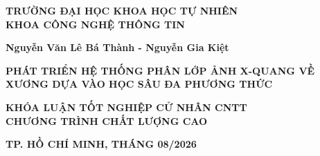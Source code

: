 \begin{titlepage}

\begin{center}

\color{yellow!95!black} %
\vspace*{0.3cm}

{\bfseries TRƯỜNG ĐẠI HỌC KHOA HỌC TỰ NHIÊN\\
KHOA CÔNG NGHỆ THÔNG TIN\\[2cm]}

{\large \bfseries Nguyễn Văn Lê Bá Thành - Nguyễn Gia Kiệt\\[2cm]}

{\Large \bfseries PHÁT TRIỂN HỆ THỐNG PHÂN LỚP ẢNH X-QUANG VỀ XƯƠNG DỰA VÀO HỌC SÂU ĐA PHƯƠNG THỨC\\[3cm]}

{\bfseries KHÓA LUẬN TỐT NGHIỆP CỬ NHÂN CNTT\\
CHƯƠNG TRÌNH CHẤT LƯỢNG CAO}

\vfill {\bfseries TP. HỒ CHÍ MINH, THÁNG 08/2026}

\end{center}

\pagebreak
\color{black} %





\end{titlepage}
